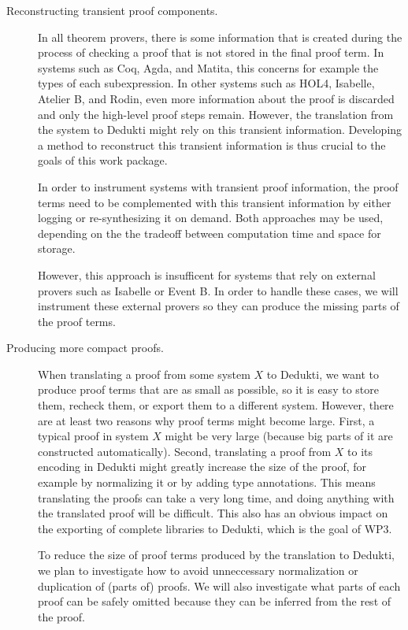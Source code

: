 \begin{description}
  \item[Reconstructing transient proof components.] In all theorem
  provers, there is some information that is created during the
  process of checking a proof that is not stored in the final proof
  term. In systems such as Coq, Agda, and Matita, this concerns for
  example the types of each subexpression. In other systems such as
  HOL4, Isabelle, Atelier B, and Rodin, even more information about
  the proof is discarded and only the high-level proof steps remain.
  However, the translation from the system to Dedukti might rely on
  this transient information. Developing a method to reconstruct this
  transient information is thus crucial to the goals of this work
  package.

  In order to instrument systems with transient proof information, the
  proof terms need to be complemented with this transient information
  by either logging or re-synthesizing it on demand. Both approaches
  may be used, depending on the the tradeoff between computation time
  and space for storage.

  However, this approach is insufficent for systems that rely on
  external provers such as Isabelle or Event B. In order to handle
  these cases, we will instrument these external provers so they can
  produce the missing parts of the proof terms. 

  \item[Producing more compact proofs.] When translating a proof from
  some system $X$ to Dedukti, we want to produce proof terms that are
  as small as possible, so it is easy to store them, recheck them, or
  export them to a different system. However, there are at least two
  reasons why proof terms might become large. First, a typical proof
  in system $X$ might be very large (because big parts of it are
  constructed automatically). Second, translating a proof from $X$ to
  its encoding in Dedukti might greatly increase the size of the
  proof, for example by normalizing it or by adding type annotations.
  This means translating the proofs can take a very long time, and
  doing anything with the translated proof will be difficult. This
  also has an obvious impact on the exporting of complete libraries to
  Dedukti, which is the goal of WP3.

  To reduce the size of proof terms produced by the translation to
  Dedukti, we plan to investigate how to avoid unneccessary
  normalization or duplication of (parts of) proofs. We will also
  investigate what parts of each proof can be safely omitted because
  they can be inferred from the rest of the proof.
\end{description}

